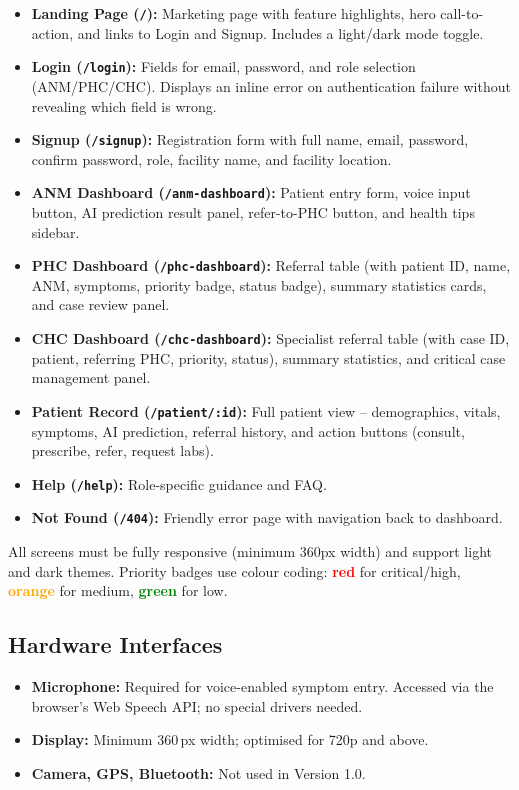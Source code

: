 \documentclass[12pt,a4paper]{article}
\begin{document}
\begin{itemize}
    \item \textbf{Landing Page (\texttt{/}):} Marketing page with feature highlights, hero call-to-action, and links to Login and Signup. Includes a light/dark mode toggle.
    \item \textbf{Login (\texttt{/login}):} Fields for email, password, and role selection (ANM/PHC/CHC). Displays an inline error on authentication failure without revealing which field is wrong.
    \item \textbf{Signup (\texttt{/signup}):} Registration form with full name, email, password, confirm password, role, facility name, and facility location.
    \item \textbf{ANM Dashboard (\texttt{/anm-dashboard}):} Patient entry form, voice input button, AI prediction result panel, refer-to-PHC button, and health tips sidebar.
    \item \textbf{PHC Dashboard (\texttt{/phc-dashboard}):} Referral table (with patient ID, name, ANM, symptoms, priority badge, status badge), summary statistics cards, and case review panel.
    \item \textbf{CHC Dashboard (\texttt{/chc-dashboard}):} Specialist referral table (with case ID, patient, referring PHC, priority, status), summary statistics, and critical case management panel.
    \item \textbf{Patient Record (\texttt{/patient/:id}):} Full patient view -- demographics, vitals, symptoms, AI prediction, referral history, and action buttons (consult, prescribe, refer, request labs).
    \item \textbf{Help (\texttt{/help}):} Role-specific guidance and FAQ.
    \item \textbf{Not Found (\texttt{/404}):} Friendly error page with navigation back to dashboard.
\end{itemize}

All screens must be fully responsive (minimum 360px width) and support light and dark themes. Priority badges use colour coding: \textcolor{red}{\textbf{red}} for critical/high, \textcolor{orange}{\textbf{orange}} for medium, \textcolor{green}{\textbf{green}} for low.

\subsection{Hardware Interfaces}
\begin{itemize}
    \item \textbf{Microphone:} Required for voice-enabled symptom entry. Accessed via the browser's Web Speech API; no special drivers needed.
    \item \textbf{Display:} Minimum 360\,px width; optimised for 720p and above.
    \item \textbf{Camera, GPS, Bluetooth:} Not used in Version 1.0.
\end{itemize}
\end{document}
